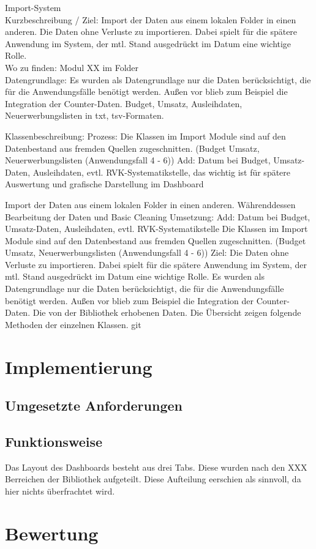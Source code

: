     Import-System\\
    Kurzbeschreibung / Ziel: Import der Daten aus einem lokalen Folder in einen anderen. 
    Die Daten ohne Verluste zu importieren. Dabei spielt für die spätere Anwendung im System, der mtl. Stand ausgedrückt im Datum eine wichtige Rolle.\\
    Wo zu finden: Modul XX im Folder \\
    Datengrundlage: Es wurden als Datengrundlage nur die Daten berücksichtigt, die für die Anwendungsfälle benötigt werden.
    Außen vor blieb zum Beispiel die Integration der Counter-Daten.
    Budget, Umsatz, Ausleihdaten, Neuerwerbungslisten in txt, tsv-Formaten.
    
    Klassenbeschreibung:
    Prozess: Die Klassen im Import Module sind auf den Datenbestand aus fremden Quellen zugeschnitten.
    (Budget Umsatz, Neuerwerbungslisten (Anwendungsfall 4 - 6))
    Add: Datum bei Budget, Umsatz-Daten, Ausleihdaten, evtl. RVK-Systematikstelle, das wichtig ist für spätere Auswertung und grafische Darstellung
    im Dashboard
    
    
 
    
    
    Import der Daten aus einem lokalen Folder in einen anderen. 
    Währenddessen Bearbeitung der Daten und Basic Cleaning
    Umsetzung:
    Add: Datum bei Budget, Umsatz-Daten, Ausleihdaten, evtl. RVK-Systematikstelle 
    Die Klassen im Import Module sind auf den Datenbestand aus fremden Quellen zugeschnitten.
    (Budget Umsatz, Neuerwerbungslisten (Anwendungsfall 4 - 6))
    Ziel: Die Daten ohne Verluste zu importieren. Dabei spielt für die spätere Anwendung im System, der mtl. Stand
    ausgedrückt im Datum eine wichtige Rolle.
    Es wurden als Datengrundlage nur die Daten berücksichtigt, die für die Anwendungsfälle benötigt werden.
    Außen vor blieb zum Beispiel die Integration der Counter-Daten.
    Die von der Bibliothek erhobenen Daten. Die Übersicht zeigen folgende Methoden der einzelnen Klassen.
    git
    
    
    

\section{Implementierung}
    \subsection{Umgesetzte Anforderungen}
    \subsection{Funktionsweise}
    Das Layout des Dashboards besteht aus drei Tabs. Diese wurden nach den XXX Berreichen der Bibliothek aufgeteilt. Diese Aufteilung eerschien als sinnvoll,
    da hier nichts überfrachtet wird.

\section{Bewertung}
